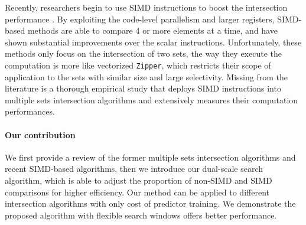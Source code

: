 
Recently, researchers begin to use SIMD instructions to boost the intersection performance \cite{inoue2014faster,Schlegel2011Fast,lemire2016simd}.
By exploiting the code-level parallelism and larger registers, SIMD-based methods are able to compare 4 or more elements at a time, and have shown substantial improvements over the scalar instructions.
Unfortunately, these methods only focus on the intersection of two sets, the way they execute the computation is more like vectorized \texttt{Zipper}, which restricts their scope of application to the sets with similar size and large selectivity.
Missing from the literature is a thorough empirical study that deploys SIMD instructions into multiple sets intersection algorithms and extensively measures their computation performances.

\paragraph{Our contribution}
We first provide a review of the former multiple sets intersection algorithms and recent SIMD-based algorithms, then we introduce our dual-scale search algorithm, which is able to adjust the proportion of non-SIMD and SIMD comparisons for higher efficiency.
Our method can be applied to different intersection algorithms with only cost of predictor training.
We demonstrate the proposed algorithm with flexible search windows offers better performance.

